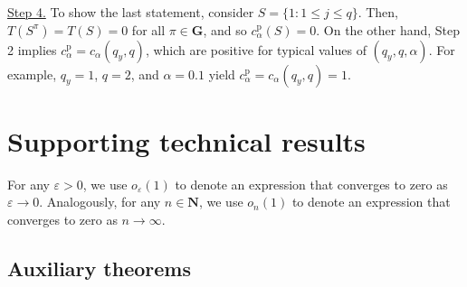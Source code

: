\documentclass[11pt]{article}
\numberwithin{equation}{section}
\begin{document}
\noindent \underline{Step 4.} To show the last statement, consider $S=\{1 :1\le j \le q\}$. Then, $T(S^{\pi })=T(S)=0$ for all $\pi \in \mathbf{G}$, and so $c_{\alpha }^{\mathrm{p}}(S)=0$. On the
other hand, Step 2 implies $c_{\alpha }^{\mathrm{p}}=c_{\alpha }\left( q_{y},q\right) $, which are positive for typical values of $\left( q_{y},q,\alpha \right) $. For example, $q_{y}=1$, $q=2$, and $\alpha =0.1$ yield $c_{\alpha }^{\mathrm{p}}=c_{\alpha }\left( q_{y},q\right) =1.$

\section{Supporting technical results}\label{app:auxiliary}
For any $\varepsilon>0$, we use $o_{\varepsilon}(1)$ to denote an expression that converges to zero as $\varepsilon \to 0$. Analogously, for any $n \in \mathbf{N}$, we use $o_{n}(1)$ to denote an expression that converges to zero as $n \to \infty$.

\subsection{Auxiliary theorems}
\end{document}
